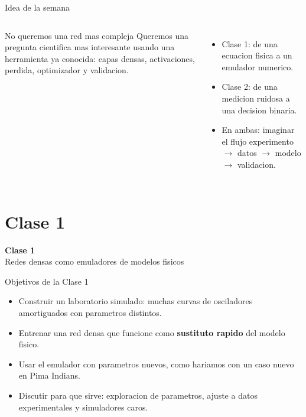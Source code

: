\begin{frame}{Idea de la semana}
\begin{columns}[T,onlytextwidth]
\begin{block}{No queremos una red mas compleja}
Queremos una pregunta cientifica mas interesante usando una herramienta ya conocida: capas densas, activaciones, perdida, optimizador y validacion.
\end{block}
\begin{itemize}
    \item Clase 1: de una ecuacion fisica a un emulador numerico.
    \item Clase 2: de una medicion ruidosa a una decision binaria.
    \item En ambas: imaginar el flujo experimento $\rightarrow$ datos $\rightarrow$ modelo $\rightarrow$ validacion.
\end{itemize}
\centering
\resizebox{0.96\linewidth}{!}{}
\end{columns}
\end{frame}

\section{Clase 1}

\begin{frame}[plain]
\centering
\vfill
{\Huge \bfseries Clase 1}\\[0.4cm]
{\Large Redes densas como emuladores de modelos fisicos}
\vfill
\end{frame}

\begin{frame}{Objetivos de la Clase 1}
\begin{itemize}
    \item Construir un laboratorio simulado: muchas curvas de osciladores amortiguados con parametros distintos.
    \item Entrenar una red densa que funcione como \textbf{sustituto rapido} del modelo fisico.
    \item Usar el emulador con parametros nuevos, como hariamos con un caso nuevo en Pima Indians.
    \item Discutir para que sirve: exploracion de parametros, ajuste a datos experimentales y simuladores caros.
\end{itemize}
\end{frame}

